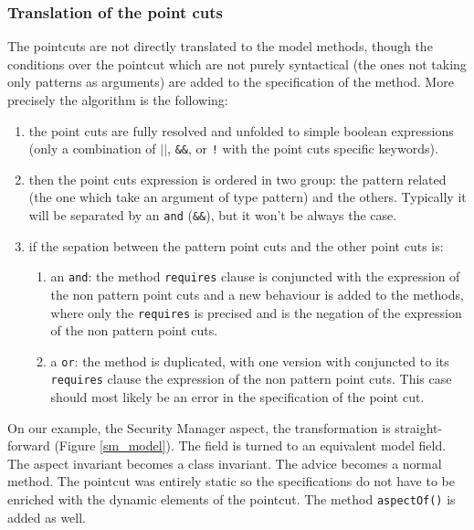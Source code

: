 \subsubsection{Translation of the point cuts}
The pointcuts are not directly translated to the model methods, though
the conditions over the pointcut which are not purely syntactical (the
ones not taking only patterns as arguments) are added to the
specification of the method.  More precisely the algorithm is the
following:
\begin{enumerate}
\item 
the point cuts are fully resolved and unfolded to simple boolean
expressions (only a combination of {\tt $||$}, {\tt \&\&}, or {\tt !}
with the point cuts specific keywords).
\item 
then the point cuts expression is ordered in two group: the pattern
related (the one which take an argument of type pattern) and the
others. Typically it will be separated by an {\tt and} ({\tt \&\&}),
but it won't be always the case.
\item 
if the sepation between the pattern point cuts and the other point
cuts is:
\begin{enumerate}
\item 
an {\tt and}: the method {\tt requires} clause is conjuncted with the
expression of the non pattern point cuts and a new behaviour is added
to the methods, where only the {\tt requires} is precised and is the
negation of the expression of the non pattern point cuts.
\item 
a {\tt or}: the method is duplicated, with one version with conjuncted
 to its {\tt requires} clause the expression of the non pattern point
 cuts. This case should most likely be an error in the specification
 of the point cut.
\end{enumerate}
\end{enumerate}

On our example, the Security Manager aspect, the transformation is
straight-forward (Figure \ref{sm_model}).
 The field is turned to an equivalent model field. The 
aspect invariant becomes a class invariant. The advice becomes a normal 
method. The pointcut was entirely static so the specifications do not have
to be enriched with the dynamic elements of the pointcut. The method
{\tt aspectOf()} is added as well.


